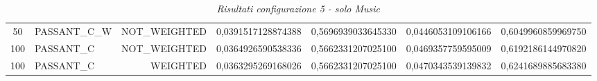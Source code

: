 \begin{table}[H]
{\begin{tabular}{ c l r c c c c }
					50 & PASSANT\_C\_W & NOT\_WEIGHTED & 0,0391517128874388 & 0,5696939033645330 & 0,0446053109106166 & 0,6049960859969750 \\
					
					100 &  PASSANT\_C & NOT\_WEIGHTED & 0,0364926590538336 & 0,5662331207025100 & 0,0469357759595009 & 0,6192186144970820 \\
					
					100 &  PASSANT\_C &   WEIGHTED & 0,0363295269168026 & 0,5662331207025100 & 0,0470343539139832 & 0,6241689885683380 \\
				\bottomrule
			\end{tabular}  
		}
\caption{\emph{Risultati configurazione 5 - solo Music}}
\end{table}   

\setlength{\tabcolsep}{12pt}
